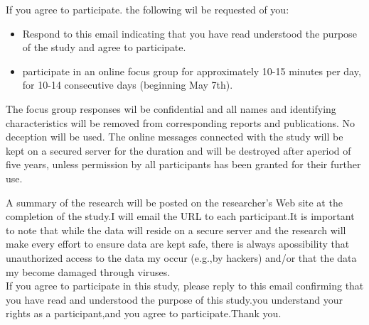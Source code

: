 \documentclass[a4,9pt]{beamer}
\begin{document}
\begin{frame}
If you agree to participate. the following wil be requested of you:\\  
\vspace*{0.2cm}

\begin{itemize}
  \item Respond to this email indicating that you have read understood the purpose of the study and agree to participate.\\ 
  
  \vspace*{0.2cm}
  
  \item participate in an online focus group for approximately 10-15 minutes per day, for 10-14 consecutive days (beginning May 7th).\\

\end{itemize}

\vspace*{0.4cm}
The focus group responses wil be confidential and all names and identifying characteristics will be removed from corresponding reports and publications. No deception will be used. The online messages connected with the study will be kept on a secured server for the duration and will be destroyed after aperiod of five years, unless permission by all participants has been granted for their further use.
\end{frame}

\begin{frame}
 A summary of the research will be posted on the researcher's Web site at the completion of the study.I will email the URL to each participant.It is important to note that while the data will reside on a secure server and the research will make every effort to ensure data are kept safe, there is always apossibility that unauthorized access to the data my occur (e.g.,by hackers) and/or that the data my become damaged through viruses.\\

\vspace*{0.4cm}
If you agree to participate in this study, please reply to this email confirming that you have read and understood the purpose of this study.you understand your rights as a participant,and you agree to participate.Thank you. \\

\end{frame}
\end{document}
